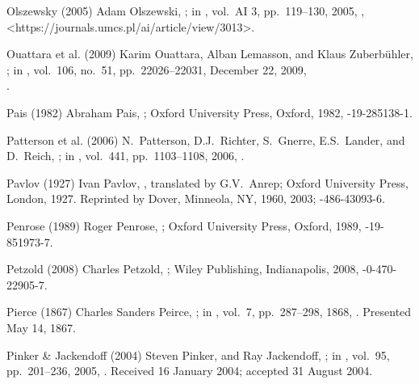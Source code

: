 \biblabel Olszewsky (2005)
Adam Olszewski,
;
in ,
vol.\ AI 3, pp.\ 119--130, 2005,
,
\URL<https://journals.umcs.pl/ai/article/view/3013>.

\biblabel Ouattara et al. (2009)
Karim Ouattara, Alban Lemasson, and Klaus Zuberbühler,\\
;
in ,
vol.\ 106, no.\ 51, pp.\ 22026--22031, December 22, 2009,\\
.

\biblabel Pais (1982)
Abraham Pais,
;
Oxford University Press, Oxford, 1982,
-19-285138-1.

\biblabel Patterson et al. (2006)
N.\ Patterson, D.J.\ Richter, S.\ Gnerre, E.S.\ Lander, and D.\ Reich,
;
in ,
vol.\ 441, pp.\ 1103--1108, 2006,
.

\biblabel Pavlov (1927)
Ivan Pavlov,
,
translated by G.V.\ Anrep;
Oxford University Press, London, 1927.
Reprinted by Dover, Minneola, NY, 1960, 2003;
-486-43093-6.

\biblabel Penrose (1989)
Roger Penrose, \negthinspace
{};
Oxford University Press, Oxford, 1989,
-19-851973-7.

\biblabel Petzold (2008)
Charles Petzold,
;
Wiley Publishing, Indianapolis, 2008,
-0-470-22905-7.

\biblabel Pierce (1867)
Charles Sanders Peirce,
;
in ,
vol.\ 7, pp.\ 287--298, 1868,
.
Presented May 14, 1867.

\biblabel Pinker \& Jackendoff (2004)
Steven Pinker, and Ray Jackendoff,
;
in ,
vol.\ 95, pp.\ 201--236, 2005,
.
Received 16 January 2004; accepted 31 August 2004.

